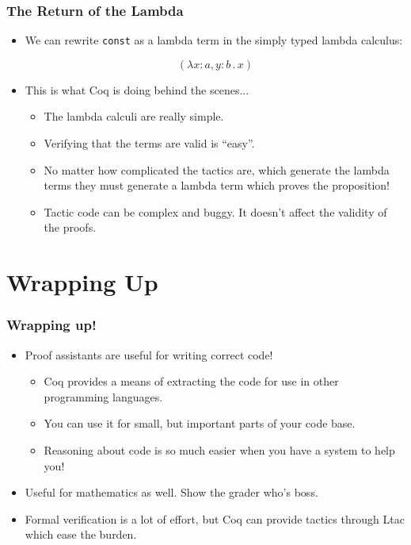 \documentclass{beamer}
\begin{document}
\begin{frame}
  \frametitle{The Return of the Lambda}

  \begin{itemize}
  \item We can rewrite \texttt{const} as a lambda term in the simply typed lambda calculus:

    \[(\lambda x : a, y : b \, . \, x)\]

  \item<2-> This is what Coq is doing behind the scenes...

    \begin{itemize}
    \item The lambda calculi are really simple.
    \item Verifying that the terms are valid is ``easy''.
    \item No matter how complicated the tactics are, which generate the lambda terms they must generate a lambda term which proves the proposition!
    \item Tactic code can be complex and buggy. It doesn't affect the validity of the proofs.
    \end{itemize}
  \end{itemize}
\end{frame}

\section{Wrapping Up}

\begin{frame}
  \frametitle{Wrapping up!}

  \begin{itemize}
  \item Proof assistants are useful for writing correct code!
    \begin{itemize}
    \item Coq provides a means of extracting the code for use in other programming languages.
    \item You can use it for small, but important parts of your code base.
    \item Reasoning about code is so much easier when you have a system to help you!
    \end{itemize}

  \item Useful for mathematics as well. Show the grader who's boss.
  \item Formal verification is a lot of effort, but Coq can provide tactics through Ltac which ease the burden.
  \end{itemize}
\end{frame}
\end{document}
